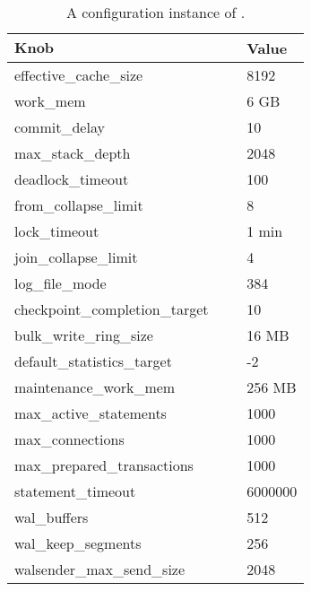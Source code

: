 \begin{table}[H]
\caption{A configuration instance of \oursys.}
\centering  
	\begin{tabular}{lll}\hline
	$\textbf{Knob}$ & & \textbf{Value} \\\hline
	effective\_cache\_size & $\ \ \ $ & 8192 \\
	work\_mem & $\ \ \ $ & 6 GB \\
	commit\_delay & $\ \ \ $ & 10 \\
	max\_stack\_depth & $\ \ \ $ & 2048 \\
	deadlock\_timeout & $\ \ \ $ & 100 \\
	from\_collapse\_limit & $\ \ \ $ & 8 \\
	lock\_timeout & $\ \ \ $ & 1 min \\
	join\_collapse\_limit & $\ \ \ $ & 4 \\	
	log\_file\_mode & $\ \ \ $ & 384 \\
	checkpoint\_completion\_target & $\ \ \ $ & 10 \\
	bulk\_write\_ring\_size  & $\ \ \ $ & 16 MB \\ %
	default\_statistics\_target & $\ \ \ $ & -2 \\
	maintenance\_work\_mem & $\ \ \ $ & 256 MB \\
	max\_active\_statements & $\ \ \ $ & 1000 \\
	max\_connections & $\ \ \ $ & 1000 \\
	max\_prepared\_transactions & $\ \ \ $ & 1000 \\
	statement\_timeout & $\ \ \ $ & 6000000 \\
	wal\_buffers & $\ \ \ $ & 512 \\
	wal\_keep\_segments & $\ \ \ $ & 256 \\
	walsender\_max\_send\_size & $\ \ \ $ & 2048 \\\hline

	\end{tabular} 
\label{tbl:knobDBA}    
\end{table} 


